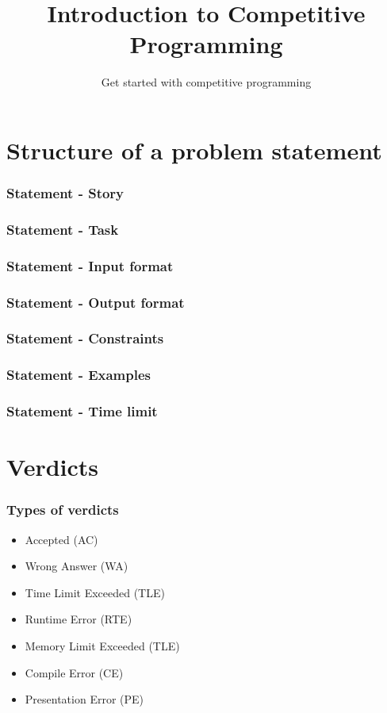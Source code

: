 
\title[Intro to CP]{Introduction to Competitive Programming}
\subtitle[Get started with CP]{Get started with competitive programming}




\section{Structure of a problem statement}
\begin{frame}
    \frametitle{Statement - Story}
\end{frame}

\begin{frame}
    \frametitle{Statement - Task}
\end{frame}

\begin{frame}
    \frametitle{Statement - Input format}
\end{frame}

\begin{frame}
    \frametitle{Statement - Output format}
\end{frame}

\begin{frame}
    \frametitle{Statement - Constraints}
\end{frame}

\begin{frame}
    \frametitle{Statement - Examples}
\end{frame}

\begin{frame}
    \frametitle{Statement - Time limit}
\end{frame}

\section{Verdicts}
\begin{frame}
    \frametitle{Types of verdicts}
    \begin{itemize}
        \item Accepted (AC) \\ \pause
        \item Wrong Answer (WA) \\ \pause
        \item Time Limit Exceeded (TLE) \\ \pause
        \item Runtime Error (RTE) \\ \pause
        \item Memory Limit Exceeded (TLE) \\ \pause
        \item Compile Error (CE) \\ \pause
        \item Presentation Error (PE) \\ 

    \end{itemize}
\end{frame}

